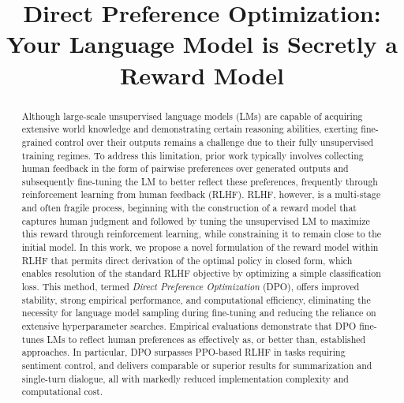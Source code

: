 \title{Direct Preference Optimization: Your Language Model is Secretly a Reward Model}

\begin{abstract}
Although large-scale unsupervised language models (LMs) are capable of acquiring extensive world knowledge and demonstrating certain reasoning abilities, exerting fine-grained control over their outputs remains a challenge due to their fully unsupervised training regimes. To address this limitation, prior work typically involves collecting human feedback in the form of pairwise preferences over generated outputs and subsequently fine-tuning the LM to better reflect these preferences, frequently through reinforcement learning from human feedback (RLHF). RLHF, however, is a multi-stage and often fragile process, beginning with the construction of a reward model that captures human judgment and followed by tuning the unsupervised LM to maximize this reward through reinforcement learning, while constraining it to remain close to the initial model. In this work, we propose a novel formulation of the reward model within RLHF that permits direct derivation of the optimal policy in closed form, which enables resolution of the standard RLHF objective by optimizing a simple classification loss. This method, termed \textit{Direct Preference Optimization} (DPO), offers improved stability, strong empirical performance, and computational efficiency, eliminating the necessity for language model sampling during fine-tuning and reducing the reliance on extensive hyperparameter searches. Empirical evaluations demonstrate that DPO fine-tunes LMs to reflect human preferences as effectively as, or better than, established approaches. In particular, DPO surpasses PPO-based RLHF in tasks requiring sentiment control, and delivers comparable or superior results for summarization and single-turn dialogue, all with markedly reduced implementation complexity and computational cost.
\end{abstract}

